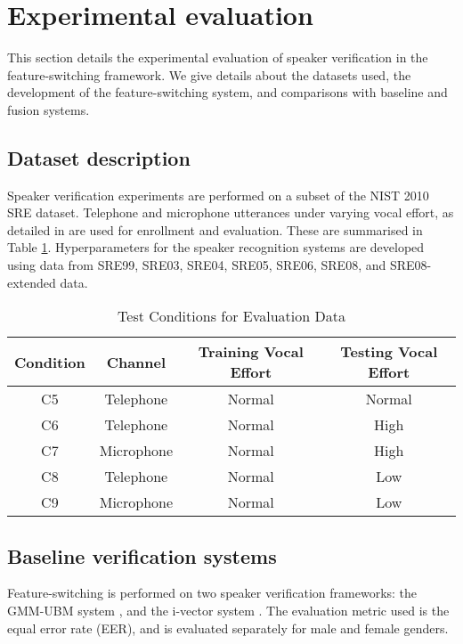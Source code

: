 \documentclass{article}
\begin{document}
\section{Experimental evaluation}
\label{sec:expts}
This section details the experimental evaluation of speaker verification in the
feature-switching framework. We give details about the datasets used, the
development of the feature-switching system, and comparisons with baseline and
fusion systems.

\subsection{Dataset description}
\label{sec:dB}
Speaker verification experiments are performed on a subset of the NIST 2010 SRE
dataset.  Telephone and microphone utterances under varying vocal effort,
as detailed in \cite{sre_eval_plan} are used for enrollment and evaluation. These are
summarised in Table \ref{tab:datasetConditions}. Hyperparameters for the speaker
recognition systems are developed using data from SRE99, SRE03, SRE04, SRE05,
SRE06, SRE08, and SRE08-extended data.

\begin{table}[h!tb]
\centering
\caption{Test Conditions for Evaluation Data}
\begin{tabular}{|c|c|c|c|}
\hline
Condition & Channel & Training Vocal Effort & Testing Vocal Effort \\ 
\hline \hline
C5 & Telephone & Normal & Normal \\ \hline
C6 & Telephone & Normal & High \\ \hline
C7 & Microphone & Normal & High \\ \hline
C8 & Telephone & Normal & Low \\ \hline
C9 & Microphone & Normal & Low \\ \hline
\end{tabular}
\label{tab:datasetConditions}
\end{table}



\subsection{Baseline verification systems}
\label{subsec:baseline}

Feature-switching is performed on two 
speaker verification frameworks: the GMM-UBM system \cite{gmmUbm}, and the
i-vector system \cite{ivector}. The evaluation metric used is
the equal error rate (EER), and is evaluated separately for male and female
genders.
\end{document}
